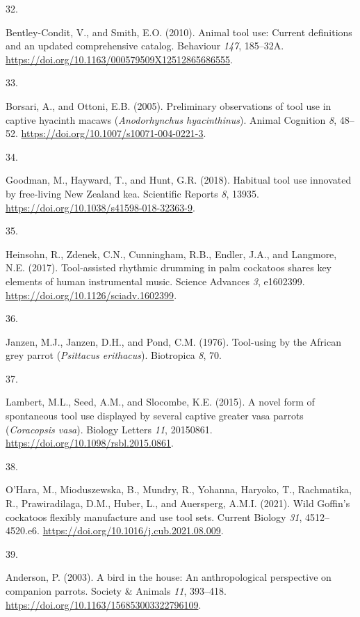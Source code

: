 \documentclass[
  man, donotrepeattitle,floatsintext]{apa6}
\newlength{\cslhangindent}
\newlength{\csllabelwidth}
\newlength{\cslentryspacingunit} %
\newenvironment{CSLReferences}[2] %
 {%
  \setlength{\parindent}{0pt}
  \ifodd #1
  \let\oldpar\par
  \def\par{\hangindent=\cslhangindent\oldpar}
  \fi
  \setlength{\parskip}{#2\cslentryspacingunit}
 }%
 {}
\newcommand{\CSLLeftMargin}[1]{\parbox[t]{\csllabelwidth}{#1}}
\newcommand{\CSLRightInline}[1]{\parbox[t]{\linewidth - \csllabelwidth}{#1}\break}
\begin{document}
\begin{CSLReferences}{0}{0}
\leavevmode{}%
\CSLLeftMargin{32. }%
\CSLRightInline{Bentley-Condit, V., and Smith, E.O. (2010). Animal tool use: Current definitions and an updated comprehensive catalog. Behaviour \emph{147}, 185--32A. \url{https://doi.org/10.1163/000579509X12512865686555}.}

\leavevmode{}%
\CSLLeftMargin{33. }%
\CSLRightInline{Borsari, A., and Ottoni, E.B. (2005). Preliminary observations of tool use in captive hyacinth macaws (\emph{{A}nodorhynchus hyacinthinus}). Animal Cognition \emph{8}, 48--52. \url{https://doi.org/10.1007/s10071-004-0221-3}.}

\leavevmode{}%
\CSLLeftMargin{34. }%
\CSLRightInline{Goodman, M., Hayward, T., and Hunt, G.R. (2018). Habitual tool use innovated by free-living {N}ew {Z}ealand kea. Scientific Reports \emph{8}, 13935. \url{https://doi.org/10.1038/s41598-018-32363-9}.}

\leavevmode{}%
\CSLLeftMargin{35. }%
\CSLRightInline{Heinsohn, R., Zdenek, C.N., Cunningham, R.B., Endler, J.A., and Langmore, N.E. (2017). Tool-assisted rhythmic drumming in palm cockatoos shares key elements of human instrumental music. Science Advances \emph{3}, e1602399. \url{https://doi.org/10.1126/sciadv.1602399}.}

\leavevmode{}%
\CSLLeftMargin{36. }%
\CSLRightInline{Janzen, M.J., Janzen, D.H., and Pond, C.M. (1976). Tool-using by the {A}frican grey parrot (\emph{{P}sittacus erithacus}). Biotropica \emph{8}, 70.}

\leavevmode{}%
\CSLLeftMargin{37. }%
\CSLRightInline{Lambert, M.L., Seed, A.M., and Slocombe, K.E. (2015). A novel form of spontaneous tool use displayed by several captive greater vasa parrots (\emph{{C}oracopsis vasa}). Biology Letters \emph{11}, 20150861. \url{https://doi.org/10.1098/rsbl.2015.0861}.}

\leavevmode{}%
\CSLLeftMargin{38. }%
\CSLRightInline{O'Hara, M., Mioduszewska, B., Mundry, R., Yohanna, Haryoko, T., Rachmatika, R., Prawiradilaga, D.M., Huber, L., and Auersperg, A.M.I. (2021). Wild {G}offin's cockatoos flexibly manufacture and use tool sets. Current Biology \emph{31}, 4512--4520.e6. \url{https://doi.org/10.1016/j.cub.2021.08.009}.}

\leavevmode{}%
\CSLLeftMargin{39. }%
\CSLRightInline{Anderson, P. (2003). A bird in the house: An anthropological perspective on companion parrots. Society \& Animals \emph{11}, 393--418. \url{https://doi.org/10.1163/156853003322796109}.}


\end{CSLReferences}
\end{document}
